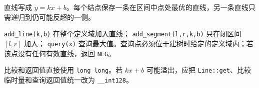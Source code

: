 直线写成 $y=kx+b$。每个结点保存一条在区间中点处最优的直线，另一条直线只需递归到仍可能反超的一侧。

\texttt{add\_line(k,b)} 在整个定义域加入直线；
\texttt{add\_segment(l,r,k,b)} 只在闭区间 $[l,r]$ 加入；
\texttt{query(x)} 查询最大值。查询点必须位于建树时给定的定义域内；若该点没有任何有效直线，返回 \texttt{NEG}。

\begin{icpcwarning}[数值范围]
  比较和返回值直接使用 \texttt{long long}。若 $kx+b$ 可能溢出，应把
  \texttt{Line::get}、比较临时量和查询返回值统一改为 \texttt{\_\_int128}。
\end{icpcwarning}
